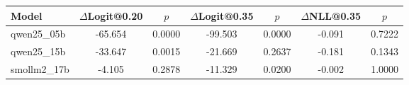 \begin{tabular}{lcccccc}
\toprule
Model & $\Delta$Logit@0.20 & $p$ & $\Delta$Logit@0.35 & $p$ & $\Delta$NLL@0.35 & $p$ \\
\midrule
qwen25\_05b & -65.654 & 0.0000 & -99.503 & 0.0000 & -0.091 & 0.7222 \\
qwen25\_15b & -33.647 & 0.0015 & -21.669 & 0.2637 & -0.181 & 0.1343 \\
smollm2\_17b & -4.105 & 0.2878 & -11.329 & 0.0200 & -0.002 & 1.0000 \\
\bottomrule
\end{tabular}